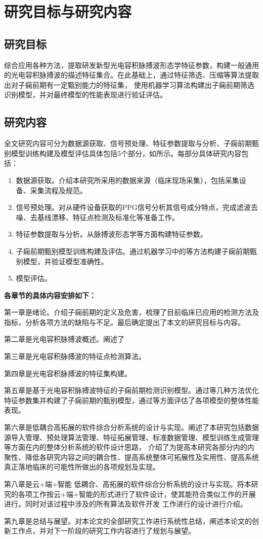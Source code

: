 \section{研究目标与研究内容}

\subsection{研究目标}
综合应用各种方法，提取研发新型光电容积脉搏波形态学特征参数，构建一般通用的光电容积脉搏波的描述特征集合。在此基础上，通过特征筛选、压缩等算法提取出对子痫前期有一定甄别能力的特征集，
使用机器学习算法构建出子痫前期筛选识别模型，并对最终模型的性能表现进行验证评估。
\subsection{研究内容}
全文研究内容可分为数据源获取、信号预处理、特征参数提取与分析、子痫前期甄别模型训练构建及模型评估具体包括5个部分，如所示。每部分具体研究内容包括：
\begin{enumerate}
    \item 数据源获取。介绍本研究所采用的数据来源（临床现场采集），包括采集设备、采集流程及规范。  
    \item 信号预处理。对从硬件设备获取的PPG信号分析其信号成分特点，完成滤波去噪、去基线漂移、特征点检测及标准化等准备工作。
    \item 特征参数提取与分析。从脉搏波形态学等方面构建特征参数。
    \item 子痫前期甄别模型训练构建及评估。通过机器学习中的等方法构建子痫前期甄别模型，并验证模型准确性。
    \item 模型评估。
\end{enumerate}

\textbf{各章节的具体内容安排如下：}

第一章是绪论。介绍子痫前期的定义及危害，梳理了目前临床已应用的检测方法及指标，分析各项方法的缺陷与不足。最后确定提出了本文的研究目标与内容。

第二章是光电容积脉搏波概述。阐述了

第三章是光电容积脉搏波的特征点检测算法。

第四章是光电容积脉搏波的特征集构建。

第五章是基于光电容积脉搏波特征的子痫前期检测识别模型。通过等几种方法优化特征参数集并构建了子痫前期的甄别模型，通过等方面评估了各项模型的整体性能表现。

第六章是低耦合高拓展的软件综合分析系统的设计与实现。阐述了本研究包括数据源导入管理、预处理算法管理、特征拓展管理、标准数据管理、模型训练生成管理等方面在内的整体分析系统的软件设计思路，
介绍了为提高本研究各部分内的内聚性、降低各研究内容之间的耦合性、提高系统整体可拓展性及实用性、提高系统真正落地临床的可能性所做出的各项规划及实现。

第八章是云+端+智能 低耦合、高拓展的软件综合分析系统的设计与实现。将本研究的各项工作按云+端+智能的形式进行了软件设计，使其能符合类似工作的开展进行。同时对该过程中涉及的所有算法及软件开发
工作进行的设计进行介绍。

第九章是总结与展望。对本论文的全部研究工作进行系统性总结，阐述本论文的创新工作点，并对下一阶段的研究工作内容进行了规划与展望。
